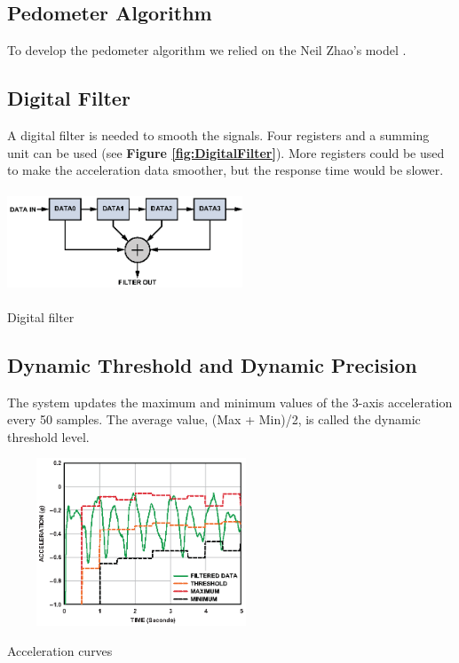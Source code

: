\documentclass[a4paper,10pt]{article}
\makeatletter
\newenvironment{figurehere}{\def\@captype{figure}\vspace{2ex}}{\vspace{1ex}}
\makeatother
\begin{document}
\begin{multicols}{2}
\section{Pedometer Algorithm}

To develop the pedometer algorithm we relied on the Neil Zhao's model .\cite{NeilZhao}


\subsection{Digital Filter}

A digital filter is needed to smooth the signals. Four registers and a summing unit can be used  (see {\bf Figure
\ref{fig:DigitalFilter}}).  More registers could be used to make the acceleration data smoother, but the response time would be slower.

\begin{figurehere}
 \centering
 \includegraphics[width=7cm, height=3cm]{./eps/DigitalFilter.eps}
 \caption{Digital filter}
 \label{fig:DigitalFilter}
\end{figurehere}

\subsection{Dynamic Threshold and Dynamic Precision}

The system updates the maximum and minimum values of the 3-axis acceleration every 50 samples. The average value, (Max + Min)/2, is called the dynamic threshold level. 

\begin{figurehere}
 \centering
 \includegraphics[width=8cm, height=5cm]{./eps/Threshold.eps}
 \caption{Acceleration curves}
 \label{fig:Threshold}
\end{figurehere}


\end{multicols}
\end{document}
